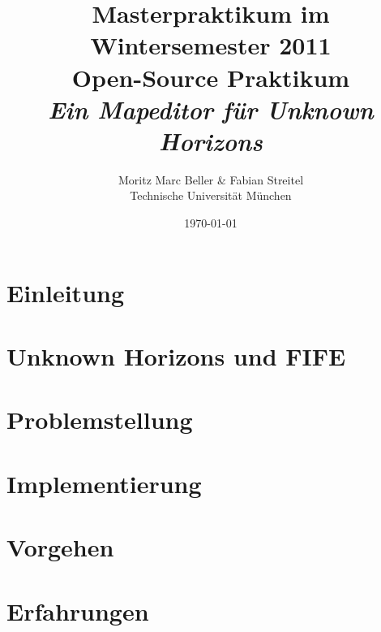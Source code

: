 \documentclass[german]{scrartcl}
\author{Moritz Marc Beller \& Fabian Streitel \\ Technische Universität München}
\title{Masterpraktikum im Wintersemester 2011 \\
Open-Source Praktikum \\
\textit{Ein Mapeditor für Unknown Horizons}}
\date{\today} %
\begin{document}
\maketitle{}

\section{Einleitung}


\section{Unknown Horizons und FIFE}


\section{Problemstellung}


\section{Implementierung}


\section{Vorgehen}


\section{Erfahrungen}


{}
\end{document}

